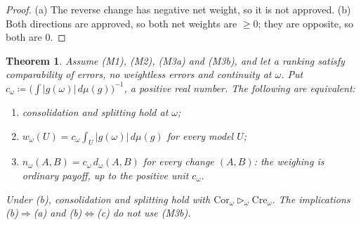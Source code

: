 \documentclass[11pt]{article}
\newtheorem{theorem}{Theorem}[section]
\theoremstyle{definition}
\newcommand{\Cor}{\mathrm{Cor}}
\newcommand{\Cre}{\mathrm{Cre}}
\newcommand{\sgt}{\triangleright}
\begin{document}
\begin{proof}
(a) The reverse change has negative net weight, so it is not approved. (b) Both directions are approved, so both net weights are $\ge0$; they are opposite, so both are $0$.
\end{proof}

\begin{theorem}\label{thm:monetary}
Assume (M1), (M2), (M3a) and (M3b), and let a ranking satisfy comparability of errors, no weightless errors and continuity at $\omega$. Put $c_\omega\coloneqq\bigl(\int|g(\omega)|\,d\mu(g)\bigr)^{-1}$, a positive real number. The following are equivalent:
\begin{enumerate}[label=(\alph*)]
\item consolidation and splitting hold at $\omega$;
\item $w_\omega(U)=c_\omega\int_U|g(\omega)|\,d\mu(g)$ for every model $U$;
\item $n_\omega(A,B)=c_\omega\,d_\omega(A,B)$ for every change $(A,B)$: the weighing is ordinary payoff, up to the positive unit $c_\omega$.
\end{enumerate}
Under (b), consolidation and splitting hold with $\Cor_\omega\sgt_\omega\Cre_\omega$. The implications (b)$\Rightarrow$(a) and (b)$\Leftrightarrow$(c) do not use (M3b).
\end{theorem}
\end{document}
